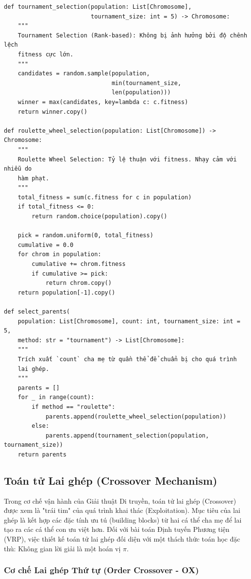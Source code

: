 \documentclass[12pt,a4paper]{article}
\numberwithin{figure}{subsection}
\begin{document}
\begin{verbatim}
def tournament_selection(population: List[Chromosome], 
                         tournament_size: int = 5) -> Chromosome:
    """
    Tournament Selection (Rank-based): Không bị ảnh hưởng bởi độ chênh lệch 
    fitness cực lớn.
    """
    candidates = random.sample(population, 
                               min(tournament_size, 
                               len(population)))
    winner = max(candidates, key=lambda c: c.fitness)
    return winner.copy()

def roulette_wheel_selection(population: List[Chromosome]) -> Chromosome:
    """
    Roulette Wheel Selection: Tỷ lệ thuận với fitness. Nhạy cảm với nhiễu do 
    hàm phạt.
    """
    total_fitness = sum(c.fitness for c in population)
    if total_fitness <= 0:
        return random.choice(population).copy()

    pick = random.uniform(0, total_fitness)
    cumulative = 0.0
    for chrom in population:
        cumulative += chrom.fitness
        if cumulative >= pick:
            return chrom.copy()
    return population[-1].copy()

def select_parents(
    population: List[Chromosome], count: int, tournament_size: int = 5, 
    method: str = "tournament") -> List[Chromosome]:
    """
    Trích xuất `count` cha mẹ từ quần thể để chuẩn bị cho quá trình 
    lai ghép.
    """
    parents = []
    for _ in range(count):
        if method == "roulette":
            parents.append(roulette_wheel_selection(population))
        else:
            parents.append(tournament_selection(population, tournament_size))
    return parents
\end{verbatim}

\subsection{Toán tử Lai ghép (Crossover Mechanism)}

Trong cơ chế vận hành của Giải thuật Di truyền, toán tử lai ghép (Crossover) được xem là "trái tim" của quá trình khai thác (Exploitation). Mục tiêu của lai ghép là kết hợp các đặc tính ưu tú (building blocks) từ hai cá thể cha mẹ để lai tạo ra các cá thể con ưu việt hơn. Đối với bài toán Định tuyến Phương tiện (VRP), việc thiết kế toán tử lai ghép đối diện với một thách thức toán học đặc thù: Không gian lời giải là một hoán vị $\pi$.

\subsubsection{Cơ chế Lai ghép Thứ tự (Order Crossover - OX)}
\end{document}

